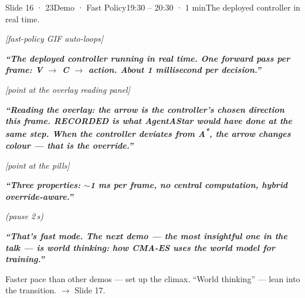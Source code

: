 \documentclass[11pt,a4paper]{article}
\newcommand{\say}[1]{%
    \par\vspace{0.3em}%
    \begingroup
    \leftskip=12pt
    \rightskip=8pt
    \color{thStrong}%
    \itshape\textbf{“#1”}%
    \par
    \endgroup
    \vspace{0.2em}
}
\newcommand{\beat}[1][2]{%
    \par\textcolor{thMuted}{\small\textit{(pause #1\,s)}}\par
    \vspace{0.2em}
}
\newcommand{\stage}[1]{%
    \par\textcolor{thMuted}{\small\textit{[#1]}}\par
    \vspace{0.2em}
}
\newcommand{\emphw}[1]{\textbf{\textcolor{thAmber}{#1}}}
\begin{document}
\begin{slide}{Slide 16 · 23}{Demo · Fast Policy}{19:30 – 20:30 · 1 min}{The deployed controller in real time.}
\stage{fast-policy GIF auto-loops}

\say{The \emphw{deployed controller running in real time}. One forward pass per frame: V $\rightarrow$ C $\rightarrow$ action. \textbf{About 1 millisecond per decision.}}

\stage{point at the overlay reading panel}

\say{Reading the overlay: the arrow is the controller's chosen direction this frame. RECORDED is what AgentAStar would have done at the same step. When the controller deviates from A\textsuperscript{*}, the arrow changes colour — that is the override.}

\stage{point at the pills}

\say{Three properties: \emphw{$\sim$1 ms per frame}, \emphw{no central computation}, \emphw{hybrid override-aware}.}
\beat
\say{That's fast mode. The next demo — the most insightful one in the talk — is \emphw{world thinking}: how CMA-ES uses the world model for training.}

\begin{stagebox}
Faster pace than other demos — set up the climax. ``World thinking'' — lean into the transition. $\rightarrow$ Slide 17.
\end{stagebox}
\end{slide}
\end{document}
